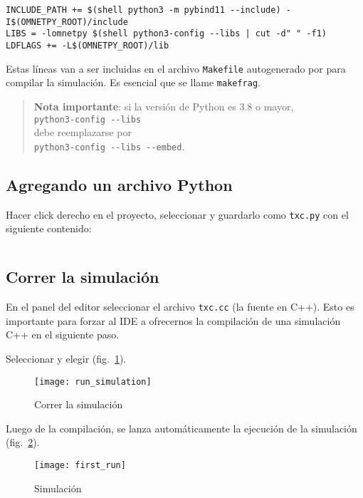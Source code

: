 \begin{verbatim}
INCLUDE_PATH += $(shell python3 -m pybind11 --include) -I$(OMNETPY_ROOT)/include
LIBS = -lomnetpy $(shell python3-config --libs | cut -d" " -f1)
LDFLAGS += -L$(OMNETPY_ROOT)/lib
\end{verbatim}

Estas líneas van a ser incluidas en el archivo \verb!Makefile! autogenerado por
\omnetpp{} para compilar la simulación. Es esencial que se llame
\verb!makefrag!.

\begin{quotation}
\noindent\textbf{Nota importante}: si la versión de Python es 3.8 o mayor,\\
\verb!python3-config --libs!\\
debe reemplazarse por\\
\verb!python3-config --libs --embed!.
\end{quotation}

\subsection{Agregando un archivo Python}

Hacer click derecho en el proyecto, seleccionar  y
guardarlo como \verb!txc.py! con el siguiente contenido:

\inputminted{Python}{codelistings/tictoc.py}

\subsection{Correr la simulación}

En el panel del editor seleccionar el archivo \verb!txc.cc! (la fuente en C++).
Esto es importante para forzar al IDE a ofrecernos la compilación de una
simulación C++ en el siguiente paso.

Seleccionar  y elegir  (fig.~\ref{fig:run}).

\begin{figure}[h]
\caption{Correr la simulación}
\label{fig:run}
\centering
\texttt{[image: run\_simulation]}
\end{figure}

Luego de la compilación, se lanza automáticamente la ejecución de la
simulación (fig.~\ref{fig:first_run}).


\begin{figure}[h]
\caption{Simulación}
\label{fig:first_run}
\centering
\texttt{[image: first\_run]}
\end{figure}
